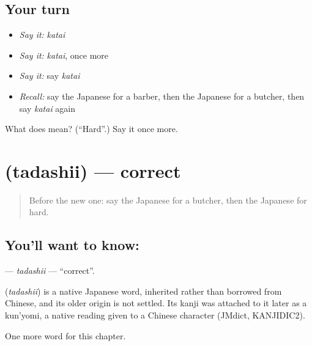 \subsection*{Your turn}
\begin{itemize}
\raggedright
  \item \emph{Say it:} \emph{katai}
  \item \emph{Say it:} \emph{katai}, once more
  \item \emph{Say it:} say \emph{katai}
  \item \emph{Recall:} say the Japanese for a barber, then the Japanese for a butcher, then say \emph{katai} again
\end{itemize}

\begin{tcolorbox}[breakable,colback=teal!4,colframe=teal!35!black,title={Before you move on}]
What does  mean? (\textquotedblleft{}Hard\textquotedblright{}.) Say it once more.
\end{tcolorbox}
\section[\texorpdfstring{\ja{ただしい} (tadashii)}{ただしい (tadashii)}]{ (tadashii) — correct}

\label{lesson:JA-C120-tadashii}



\begin{quote}
Before the new one: say the Japanese for a butcher, then the Japanese for hard.
\end{quote}

\subsection*{You'll want to know: }
\textbf{} — \emph{tadashii} — \textquotedblleft{}correct\textquotedblright{}.

\begin{cousinweb}
\textbf{} (\emph{tadashii}) is a native Japanese word, inherited rather than borrowed from Chinese, and its older origin is not settled. Its kanji was attached to it later as a kun'yomi, a native reading given to a Chinese character (JMdict, KANJIDIC2).
\end{cousinweb}

\begin{grammarlens}[title={What you've built}]
One more word for this chapter.
\end{grammarlens}

